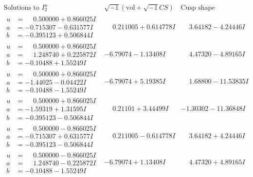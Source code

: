 \documentclass[1p]{elsarticle_modified}
\theoremstyle{definition}
\newcommand{\I}{\sqrt{-1}}
\begin{document}
$$\begin{array}{c|c|c}  
\text{Solutions to }I^u_{2}& \I (\text{vol} + \sqrt{-1}CS) & \text{Cusp shape}\\
 \hline 
\begin{aligned}
u &= \phantom{-}0.500000 + 0.866025 I \\
a &= -0.715307 - 0.631577 I \\
b &= -0.395123 + 0.506844 I\end{aligned}
 & \phantom{-}0.211005 + 0.614778 I & \phantom{-}3.64182 - 4.24446 I \\ \hline\begin{aligned}
u &= \phantom{-}0.500000 + 0.866025 I \\
a &= \phantom{-}1.248740 + 0.225872 I \\
b &= -0.10488 + 1.55249 I\end{aligned}
 & -6.79074 - 1.13408 I & \phantom{-}4.47320 - 4.89165 I \\ \hline\begin{aligned}
u &= \phantom{-}0.500000 + 0.866025 I \\
a &= -1.44025 - 0.04422 I \\
b &= -0.10488 - 1.55249 I\end{aligned}
 & -6.79074 + 5.19385 I & \phantom{-}1.68800 - 11.53835 I \\ \hline\begin{aligned}
u &= \phantom{-}0.500000 + 0.866025 I \\
a &= -1.59319 + 1.31595 I \\
b &= -0.395123 - 0.506844 I\end{aligned}
 & \phantom{-}0.21101 + 3.44499 I & -1.30302 - 11.36848 I \\ \hline\begin{aligned}
u &= \phantom{-}0.500000 - 0.866025 I \\
a &= -0.715307 + 0.631577 I \\
b &= -0.395123 - 0.506844 I\end{aligned}
 & \phantom{-}0.211005 - 0.614778 I & \phantom{-}3.64182 + 4.24446 I \\ \hline\begin{aligned}
u &= \phantom{-}0.500000 - 0.866025 I \\
a &= \phantom{-}1.248740 - 0.225872 I \\
b &= -0.10488 - 1.55249 I\end{aligned}
 & -6.79074 + 1.13408 I & \phantom{-}4.47320 + 4.89165 I \\ \hline\begin{aligned}

\end{aligned}
\end{array}$$
\end{document}
